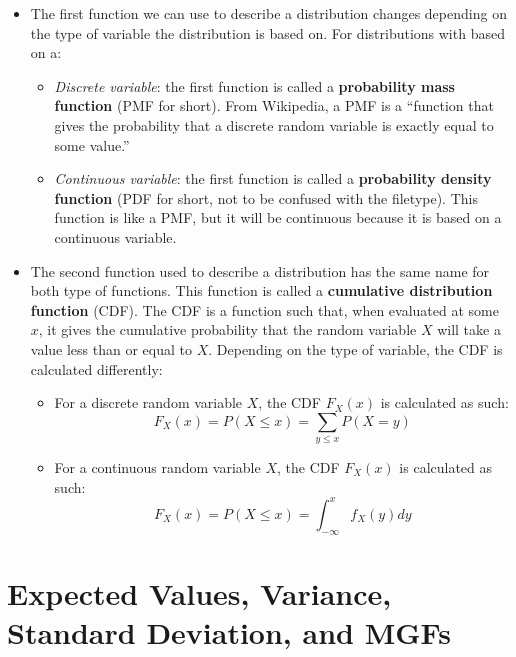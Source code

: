 \documentclass[12pt]{article}
\begin{document}
\begin{itemize}
	\item The first function we can use to describe a distribution changes depending on the type of variable the
	      distribution is based on. For distributions with based on a:

	      \begin{itemize}
		      \item \textit{Discrete variable}: the first function is called a
		            \textbf{probability mass function} (PMF for short). From Wikipedia, a
		            PMF is a ``function that gives the probability that a discrete random
		            variable is exactly equal to some value.''
		      \item \textit{Continuous variable}: the first function is called a
		            \textbf{probability density function} (PDF for short, not to be
		            confused with the filetype). This function is like a PMF, but it will
		            be continuous because it is based on a continuous variable.
	      \end{itemize}

	\item The second function used to describe a distribution has the same name
	      for both type of functions. This function is called a
	      \textbf{cumulative distribution function} (CDF). The CDF is a
	      function such that, when evaluated at some $x$, it gives the
	      cumulative probability that the random variable $X$ will take a value
	      less than or equal to $X$. Depending on the type of variable, the CDF
	      is calculated differently:
	      \begin{itemize}
		      \item For a discrete random variable $X$, the CDF $F_X(x)$ is calculated as such:
		            \[
			            F_X(x) = P(X \leq x) = \displaystyle\sum_{y\leq x}P(X = y)
		            \]
		      \item For a continuous random variable $X$, the CDF $F_X(x)$ is calculated as such:
		            \[
			            F_X(x) = P(X \leq x) = \int_{-\infty}^{x}f_X(y)dy
		            \]
	      \end{itemize}
\end{itemize}

\section{Expected Values, Variance, Standard Deviation, and MGFs}
\end{document}
